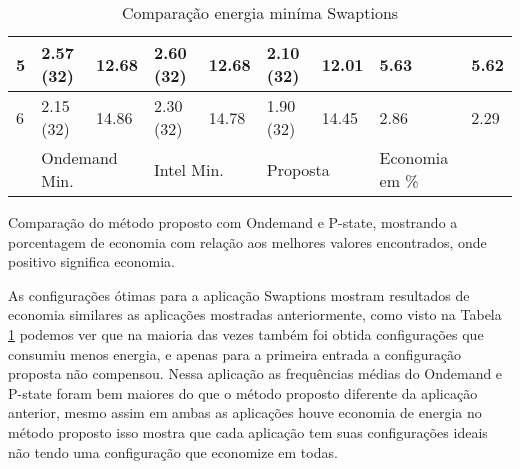 \begin{table}[H]
{\begin{tabular}{l|l|l|l|l|l|l|ll}
			\multicolumn{1}{l|}{5} & 2.57 (32) & 12.68 & 2.60 (32) & 12.68 & 2.10 (32)  & 12.01 & \multicolumn{1}{l|}{5.63} & \multicolumn{1}{l}{5.62} \\ \hline
			\multicolumn{1}{l|}{6} & 2.15 (32) & 14.86 & 2.30 (32) & 14.78 & 1.90 (32)  & 14.45 & \multicolumn{1}{l|}{2.86} & \multicolumn{1}{l}{2.29} \\ \hline
			& \multicolumn{2}{l|}{Ondemand Min.} & \multicolumn{2}{l|}{Intel Min.} & \multicolumn{2}{l|}{Proposta} & Economia em \% & \\ 
		\end{tabular}
	}
	\caption{Comparação energia miníma Swaptions}{Comparação do método proposto com Ondemand e P-state, mostrando a porcentagem de economia com relação aos melhores valores encontrados, onde positivo significa economia.}
	\label{tab:Swaptionsfreq}
\end{table}

As configurações ótimas para a aplicação Swaptions mostram resultados de economia similares as aplicações mostradas anteriormente, como visto na Tabela \ref{tab:Swaptionsfreq} podemos ver que na maioria das vezes também foi obtida configurações que consumiu menos energia, e apenas para a primeira entrada a configuração proposta não compensou. Nessa aplicação as frequências médias do Ondemand e P-state foram bem maiores do que o método proposto diferente da aplicação anterior, mesmo assim em ambas as aplicações houve economia de energia no método proposto isso mostra que cada aplicação tem suas configurações ideais não tendo uma configuração que economize em todas.

